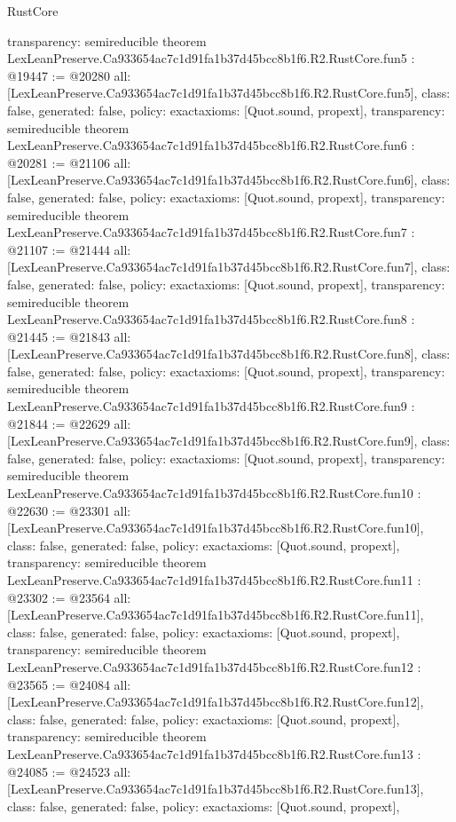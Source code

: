 \begin{lexlean}{RustCore}
\begin{coremodule}
{  transparency: semireducible
}
theorem LexLeanPreserve.Ca933654ac7c1d91fa1b37d45bcc8b1f6.R2.RustCore.fun5 : @19447 := @20280 {
  all: [LexLeanPreserve.Ca933654ac7c1d91fa1b37d45bcc8b1f6.R2.RustCore.fun5],
  class: false,
  generated: false,
  policy: exact{axioms: [Quot.sound, propext]},
  transparency: semireducible
}
theorem LexLeanPreserve.Ca933654ac7c1d91fa1b37d45bcc8b1f6.R2.RustCore.fun6 : @20281 := @21106 {
  all: [LexLeanPreserve.Ca933654ac7c1d91fa1b37d45bcc8b1f6.R2.RustCore.fun6],
  class: false,
  generated: false,
  policy: exact{axioms: [Quot.sound, propext]},
  transparency: semireducible
}
theorem LexLeanPreserve.Ca933654ac7c1d91fa1b37d45bcc8b1f6.R2.RustCore.fun7 : @21107 := @21444 {
  all: [LexLeanPreserve.Ca933654ac7c1d91fa1b37d45bcc8b1f6.R2.RustCore.fun7],
  class: false,
  generated: false,
  policy: exact{axioms: [Quot.sound, propext]},
  transparency: semireducible
}
theorem LexLeanPreserve.Ca933654ac7c1d91fa1b37d45bcc8b1f6.R2.RustCore.fun8 : @21445 := @21843 {
  all: [LexLeanPreserve.Ca933654ac7c1d91fa1b37d45bcc8b1f6.R2.RustCore.fun8],
  class: false,
  generated: false,
  policy: exact{axioms: [Quot.sound, propext]},
  transparency: semireducible
}
theorem LexLeanPreserve.Ca933654ac7c1d91fa1b37d45bcc8b1f6.R2.RustCore.fun9 : @21844 := @22629 {
  all: [LexLeanPreserve.Ca933654ac7c1d91fa1b37d45bcc8b1f6.R2.RustCore.fun9],
  class: false,
  generated: false,
  policy: exact{axioms: [Quot.sound, propext]},
  transparency: semireducible
}
theorem LexLeanPreserve.Ca933654ac7c1d91fa1b37d45bcc8b1f6.R2.RustCore.fun10 : @22630 := @23301 {
  all: [LexLeanPreserve.Ca933654ac7c1d91fa1b37d45bcc8b1f6.R2.RustCore.fun10],
  class: false,
  generated: false,
  policy: exact{axioms: [Quot.sound, propext]},
  transparency: semireducible
}
theorem LexLeanPreserve.Ca933654ac7c1d91fa1b37d45bcc8b1f6.R2.RustCore.fun11 : @23302 := @23564 {
  all: [LexLeanPreserve.Ca933654ac7c1d91fa1b37d45bcc8b1f6.R2.RustCore.fun11],
  class: false,
  generated: false,
  policy: exact{axioms: [Quot.sound, propext]},
  transparency: semireducible
}
theorem LexLeanPreserve.Ca933654ac7c1d91fa1b37d45bcc8b1f6.R2.RustCore.fun12 : @23565 := @24084 {
  all: [LexLeanPreserve.Ca933654ac7c1d91fa1b37d45bcc8b1f6.R2.RustCore.fun12],
  class: false,
  generated: false,
  policy: exact{axioms: [Quot.sound, propext]},
  transparency: semireducible
}
theorem LexLeanPreserve.Ca933654ac7c1d91fa1b37d45bcc8b1f6.R2.RustCore.fun13 : @24085 := @24523 {
  all: [LexLeanPreserve.Ca933654ac7c1d91fa1b37d45bcc8b1f6.R2.RustCore.fun13],
  class: false,
  generated: false,
  policy: exact{axioms: [Quot.sound, propext]},
}
\end{coremodule}
\end{lexlean}
